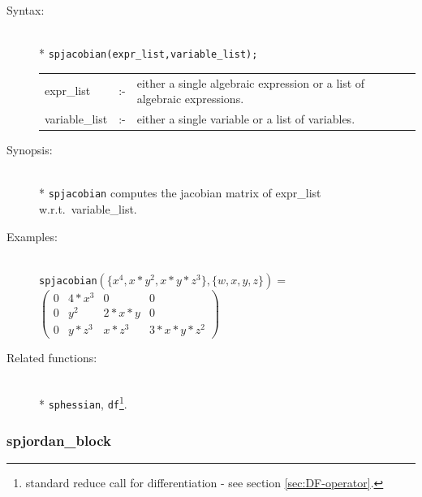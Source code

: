 \begin{description}
\item[Syntax:]\mbox{}\\*
\texttt{spjacobian(expr\_list,variable\_list);}\\[2mm]
\begin{tabular}{l l p{.72\linewidth}}
expr\_list    &:-& either a
single algebraic expression or a list of algebraic expressions.\\
variable\_list &:-& either a single variable or a list of variables.
\end{tabular}

\item[Synopsis:]\mbox{}\\*
\texttt{spjacobian} computes the jacobian matrix of expr\_list w.r.t.\
variable\_list.

\item[Examples:]\mbox{}\\
\texttt{spjacobian}\((\{x^4,x*y^2,x*y*z^3\},\{w,x,y,z\}) =\) \\[2mm]
\(\begin{pmatrix} 0 & 4*x^3 & 0 & 0 \\ 0 & y^2 & 2*x*y & 0 \\
0 & y*z^3 & x*z^3 & 3*x*y*z^2
\end{pmatrix}\)

\item[Related functions:]\mbox{}\\*
\texttt{sphessian}, \texttt{df}\footnote{standard reduce call
for differentiation - see section \protect\ref{sec:DF-operator}.}.
\end{description}

\subsubsection{spjordan\_block}
\label{sparse:spjordan_block}
\hypertarget{operator:SPJORDAN_BLOCK}{}

